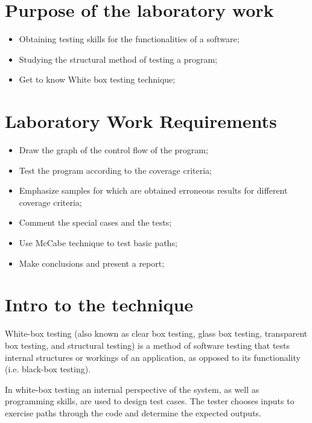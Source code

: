 \section{Purpose of the laboratory work}

\begin{itemize}
	\item Obtaining testing skills for the functionalities of a software; 
	
	\item Studying the structural method of testing a program;
	
	\item Get to know White box testing technique;
\end{itemize}

\section{Laboratory Work Requirements}
\begin{itemize}
	\item Draw the graph of the control flow of the program;
	
	\item Test the program according to the coverage criteria;
	
	\item Emphasize samples for which are obtained erroneous results for different coverage criteria;

	\item Comment the special cases and the tests;
	
	\item Use McCabe technique to test basic paths;
	
	\item Make conclusions and present a report;
\end{itemize}

\section{Intro to the technique}

White-box testing (also known as clear box testing, glass box testing, transparent box testing, and structural testing) is a method of software testing that tests internal structures or workings of an application, as opposed to its functionality (i.e. black-box testing). 

In white-box testing an internal perspective of the system, as well as programming skills, are used to design test cases. The tester chooses inputs to exercise paths through the code and determine the expected outputs.

